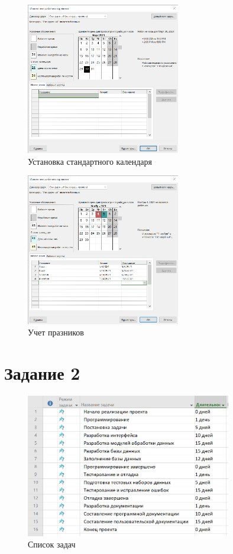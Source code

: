 \begin{figure}[H]
    \centering
    \includegraphics[width=0.6\textwidth]{img/content/task_01_3.png}
    \caption{Установка стандартного календаря}
    \label{fig:task_01_3}
\end{figure}

\begin{figure}[H]
    \centering
    \includegraphics[width=0.6\textwidth]{img/content/task_01_4.png}
    \caption{Учет празников}
    \label{fig:task_01_4}
\end{figure}

\section{Задание 2}

\begin{figure}[H]
    \centering
    \includegraphics[width=0.8\textwidth]{img/content/task_02.png}
    \caption{Список задач}
    \label{fig:task_02}
\end{figure}

